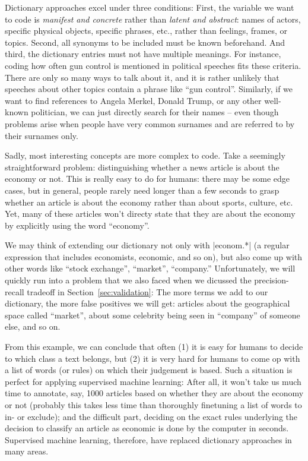 Dictionary approaches excel under three conditions: First, the
variable we want to code is \emph{manifest and concrete} rather than
\emph{latent and abstract}: names of actors, specific physical
objects, specific phrases, etc., rather than feelings, frames, or
topics. Second, all synonyms to be included must be known
beforehand. And third, the dictionary entries must not have multiple
meanings.
For instance, coding how often gun control is mentioned in political
speeches fits these criteria. There are only so many ways to talk
about it, and it is rather unlikely that speeches about other topics
contain a phrase like ``gun control''. Similarly, if we want to find
references to Angela Merkel, Donald Trump, or any other well-known
politician, we can just directly search for their names -- even though
problems arise when people have very common surnames and are referred
to by their surnames only.

Sadly, most interesting concepts are more complex to code. Take a
seemingly straightforward problem: distinguishing whether a news
article is about the economy or not. This is really easy to do for
humans: there may be some edge cases, but in general, people rarely
need longer than a few seconds to grasp whether an article is about the
economy rather than about sports, culture, etc. Yet, many of these
articles won't directy state that they are about the economy by
explicitly using the word ``economy''.

We may think of extending our dictionary not only with |econom.*| (a
regular expression that includes economists, economic, and so on), but
also come up with other words like ``stock exchange'', ``market'',
``company.'' Unfortunately, we will quickly run into a problem that we also
faced when we dicussed the precision-recall tradeoff in
Section~\ref{sec:validation}: The more terms we add to our
dictionary, the more false positives we will get: articles about
the geographical space called ``market'', about some celebrity being seen
in ``company'' of someone else, and so on.

From this example, we can conclude that often (1) it is easy for
humans to decide to which class a text belongs, but (2) it is very
hard for humans to come op with a list of words (or rules) on which
their judgement is based.  Such a situation is perfect for applying
supervised machine learning: After all, it won't take us much time to
annotate, say, 1000 articles based on whether they are about the
economy or not (probably this takes less time than thoroughly
finetuning a list of words to in- or exclude); and the difficult part,
deciding on the exact rules underlying the decision to classify an
article as economic is done by the computer in seconds. Supervised
machine learning, therefore, have replaced dictionary approaches in
many areas.

